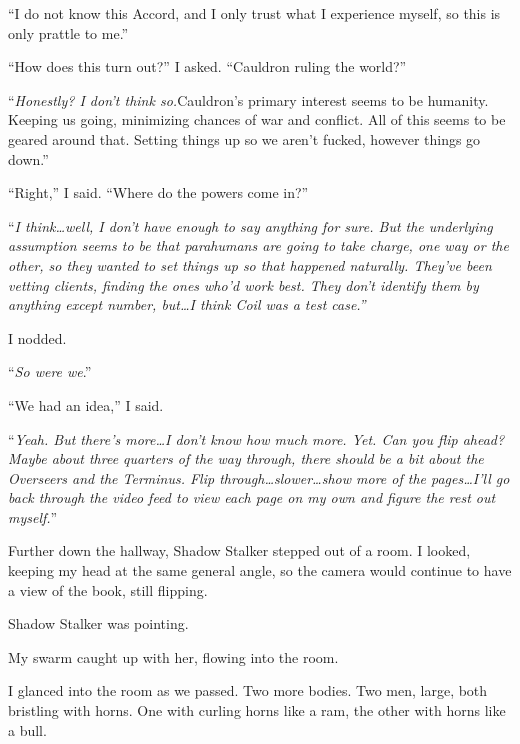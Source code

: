 ``I do not know this Accord, and I only trust what I experience myself, so this is only prattle to me.''



``How does this turn out?'' I asked.  ``Cauldron ruling the world?''



``\emph{Honestly?  I don't think so.}Cauldron's primary interest seems to be humanity.  Keeping us going, minimizing chances of war and conflict.  All of this seems to be geared around that.  Setting things up so we aren't fucked, however things go down.''



``Right,'' I said.  ``Where do the powers come in?''



``\emph{I think\ldots well, I don't have enough to say anything for sure.  But the underlying assumption seems to be that parahumans are going to take charge, one way or the other, so they wanted to set things up so that happened naturally.  They've been vetting clients, finding the ones who'd work best.  They don't identify them by anything except number, but\ldots I think Coil was a test case.''}



I nodded.



``\emph{So were we}.''



``We had an idea,'' I said.



``\emph{Yeah.  But there's more\ldots I don't know how much more.  Yet.  Can you flip ahead?  Maybe about three quarters of the way through, there should be a bit about the Overseers and the Terminus.  Flip through\ldots slower\ldots show more of the pages\ldots I'll go back through the video feed to view each page on my own and figure the rest out myself.}''



Further down the hallway, Shadow Stalker stepped out of a room.  I looked, keeping my head at the same general angle, so the camera would continue to have a view of the book, still flipping.



Shadow Stalker was pointing.



My swarm caught up with her, flowing into the room.



I glanced into the room as we passed.  Two more bodies.  Two men, large, both bristling with horns.  One with curling horns like a ram, the other with horns like a bull.



